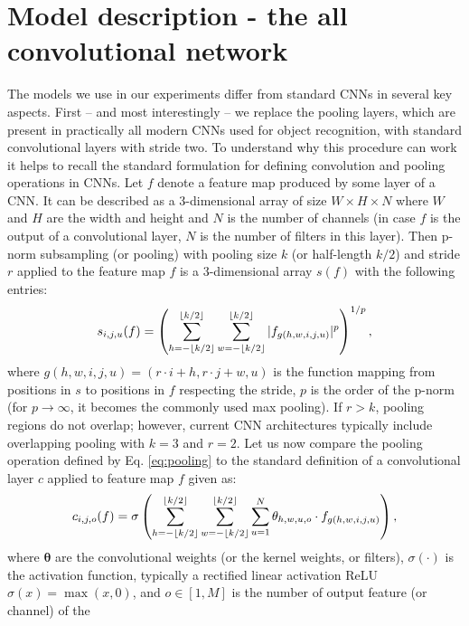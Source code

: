 \documentclass{article} \usepackage{iclr2015,times}
\DeclarePairedDelimiter\floor{\lfloor}{\rfloor}
\begin{document}
\section{Model description - the all convolutional network}
\label{sect:model}
The models we use in our experiments differ from standard CNNs in
several key aspects. First -- and most interestingly -- we replace
the pooling layers, which are present in practically all modern CNNs used for object
recognition, with standard convolutional layers with stride two. 
 To understand why this procedure can work it helps to recall the standard
 formulation for defining convolution and pooling operations in
 CNNs. 
Let $f$ denote a feature map produced by some layer of a CNN. It can be described as
 a 3-dimensional array of size $W \times H \times N$ where $W$ and $H$ are the width and
 height and $N$ is the number of channels (in case $f$ is the output of a convolutional layer, $N$ is the number of filters in this layer). 
 Then p-norm subsampling (or pooling) 
 with pooling size $k$ (or half-length $k/2$) and stride $r$ applied to the feature map $f$ is a 3-dimensional array $s(f)$ with the following entries:   
 \begin{equation}
   s_{i,j,u}(f) = \left (\sum_{h=-\floor{k/2}}^{\floor{k/2}} \sum_{w=-\floor{k/2}}^{\floor{k/2}}
     |f_{g(h,w,i,j,u)}|^p \right )^{1/p},
  \label{eq:pooling}
 \end{equation}
 where $g(h,w,i,j,u) = (r \cdot i + h, r \cdot j + w, u)$ is the function mapping from
 positions in $s$ to positions in $f$ respecting the stride, $p$ is
 the order of the p-norm (for $p \rightarrow \infty$, it becomes the commonly used max pooling). If
 $r > k$, pooling regions do not overlap; however, current CNN architectures typically include overlapping pooling with $k = 3$ and $r = 2$.
 Let us now compare the pooling operation defined by
 Eq. \ref{eq:pooling} to the standard definition of a
 convolutional layer $c$ applied to feature map $f$ given as:
 \begin{equation}
   c_{i,j,o}(f) = \sigma \left ( \sum_{h=-\floor{k/2}}^{\floor{k/2}}
     \sum_{w=-\floor{k/2}}^{\floor{k/2}} \sum_{u=1}^{N}
     \theta_{h,w,u,o} \cdot f_{g(h,w,i,j,u)} \right ),
  \label{eq:convolition}
 \end{equation}
 where $\mathbf{\theta}$ are the convolutional weights (or the kernel weights, or filters),
 $\sigma(\cdot)$ is the activation function, typically a rectified linear activation ReLU $\sigma(x) =
 \max(x, 0)$, and $o \in [1,M]$ is the number of output feature (or channel) of the
\end{document}
